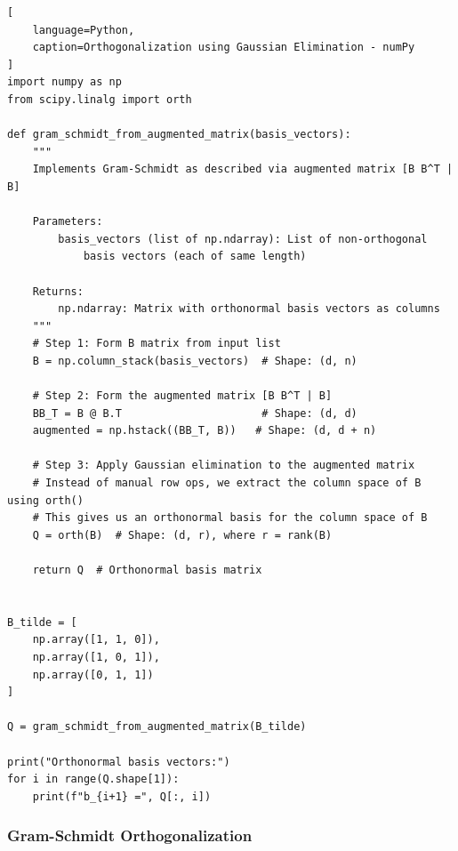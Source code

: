 \begin{lstlisting}[
    language=Python,
    caption=Orthogonalization using Gaussian Elimination - numPy
]
import numpy as np
from scipy.linalg import orth

def gram_schmidt_from_augmented_matrix(basis_vectors):
    """
    Implements Gram-Schmidt as described via augmented matrix [B B^T | B]

    Parameters:
        basis_vectors (list of np.ndarray): List of non-orthogonal
            basis vectors (each of same length)

    Returns:
        np.ndarray: Matrix with orthonormal basis vectors as columns
    """
    # Step 1: Form B matrix from input list
    B = np.column_stack(basis_vectors)  # Shape: (d, n)

    # Step 2: Form the augmented matrix [B B^T | B]
    BB_T = B @ B.T                      # Shape: (d, d)
    augmented = np.hstack((BB_T, B))   # Shape: (d, d + n)

    # Step 3: Apply Gaussian elimination to the augmented matrix
    # Instead of manual row ops, we extract the column space of B using orth()
    # This gives us an orthonormal basis for the column space of B
    Q = orth(B)  # Shape: (d, r), where r = rank(B)

    return Q  # Orthonormal basis matrix


B_tilde = [
    np.array([1, 1, 0]),
    np.array([1, 0, 1]),
    np.array([0, 1, 1])
]

Q = gram_schmidt_from_augmented_matrix(B_tilde)

print("Orthonormal basis vectors:")
for i in range(Q.shape[1]):
    print(f"b_{i+1} =", Q[:, i])
\end{lstlisting}







\subsubsection{Gram-Schmidt Orthogonalization}


